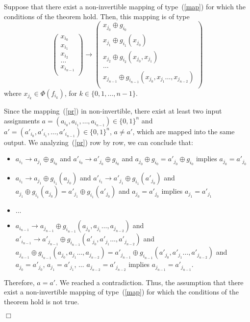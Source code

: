 \documentclass[9pt,conference]{IEEEtran} \usepackage{times}
\begin{document}
Suppose that there exist a non-invertible mapping of type~(\ref{map}) for which the conditions of the theorem hold. Then, this mapping is of type
\begin{equation} \label{pr}
\left(
\begin{array}{l}
{x}_{i_0} \\
{x}_{i_1} \\
{x}_{i_2} \\
\ldots \\
{x}_{i_{n-1}} \\
\end{array}
\right)
\rightarrow
\left(
\begin{array}{l}
x_{j_0} \oplus g_{i_0} \\
x_{j_1} \oplus g_{i_1}(x_{j_0}) \\
x_{j_2} \oplus g_{i_2}(x_{j_0},x_{j_1}) \\
\ldots \\
x_{j_{n-1}} \oplus g_{i_{n-1}}(x_{j_0},x_{j_1}\ldots,x_{j_{n-2}}) \\
\end{array}
\right)
\end{equation}
where $x_{j_k} \in \Phi(f_{i_k})$, for $k \in \{0,1,\ldots,n-1\}$.

Since the mapping~(\ref{pr}) in non-invertible, there exist at least two input assignments $a = (a_{i_0},a_{i_1},\ldots,a_{i_{n-1}}) \in \{0,1\}^n$ and $a' = (a'_{i_0},a'_{i_1},\ldots,a'_{i_{n-1}}) \in \{0,1\}^n$, $a \not= a'$, which are mapped into the same output. We analyzing~(\ref{pr}) row by row, we can conclude that:
\begin{itemize}
\item ${a}_{i_1} \rightarrow a_{j_1} \oplus g_{i_0}$ and ${a'}_{i_0} \rightarrow a'_{j_0} \oplus g_{i_0}$ and $a_{j_0} \oplus g_{i_0} = a'_{j_0} \oplus g_{i_0}$ implies $a_{j_0} = a'_{j_0}$
\item $a_{i_1} \rightarrow a_{j_1} \oplus g_{i_1}(a_{j_0})$ and $a'_{i_1} \rightarrow a'_{j_1} \oplus g_{i_1}(a'_{j_0})$ and $a_{j_1} \oplus g_{i_1}(a_{j_0}) = a'_{j_1} \oplus g_{i_1}(a'_{j_0})$ and $a_{j_0} = a'_{j_0}$ implies $a_{j_1} = a'_{j_1}$
\item $\ldots$
\item 
$a_{i_{n-1}} \rightarrow a_{j_{n-1}} \oplus g_{i_{n-1}}(a_{j_0},a_{j_1}\ldots,a_{j_{n-2}})$ 
and 
$a'_{i_{n-1}} \rightarrow a'_{j_{n-1}} \oplus g_{i_{n-1}}(a'_{j_0},a'_{j_1}\ldots,a'_{j_{n-2}})$ 
and 
$a_{j_{n-1}} \oplus g_{i_{n-1}}(a_{j_0},a_{j_1}\ldots,a_{j_{n-2}}) = a'_{j_{n-1}} \oplus g_{i_{n-1}}(a'_{j_0},a'_{j_1}\ldots,a'_{j_{n-2}})$ 
and
$a_{j_0} = a'_{j_0}$, $a_{j_1} = a'_{j_1}$, $\ldots$ $a_{j_{n-2}} = a'_{j_{n-2}}$
implies $a_{j_{n-1}} = a'_{j_{n-1}}$.
\end{itemize}
Therefore, $a = a'$. We reached a contradiction. Thus, the assumption that there exist a non-invertible mapping of type~(\ref{map}) for which the conditions of the theorem hold is not true.
\begin{flushright}
$\Box$
\end{flushright}
\end{document}

